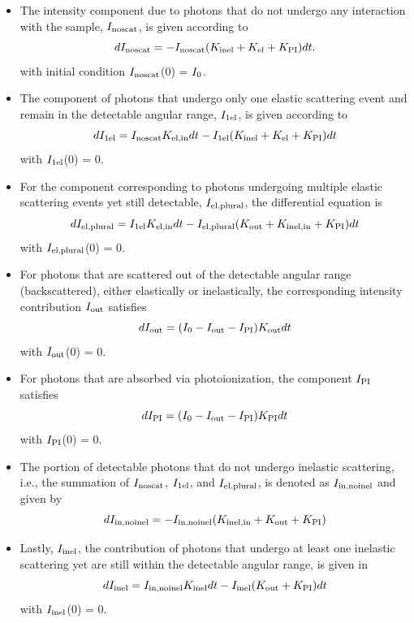 \documentclass[]{article}
\newcommand\nt{\textup{\scriptsize{0}}}
\newcommand\el{\textup{\scriptsize{el}}}
\newcommand\inel{\textup{\scriptsize{inel}}}
\newcommand\elin{\textup{\scriptsize{el,in}}}
\newcommand\inelin{\textup{\scriptsize{inel,in}}}
\newcommand\out{\textup{\scriptsize{out}}}
\newcommand\PI{\textup{\scriptsize{PI}}}
\newcommand\noscat{\textup{\scriptsize{noscat}}}
\newcommand\sel{\textup{\scriptsize{1el}}}
\newcommand\elpl{\textup{\scriptsize{el,plural}}}
\newcommand\innoinel{\textup{\scriptsize{in,noinel}}}
\begin{document}
\begin{itemize}

\item The intensity component due to photons that do not undergo any interaction with the sample, $I_{\noscat}$, is given according to
\begin{equation}
dI_{\noscat} = -I_{\noscat}(K_{\inel}+K_{\el}+K_{\PI}) dt.
\end{equation}
with initial condition $I_{\noscat}$(0) = $I_{\nt}$.

\item The component of photons that undergo only one elastic scattering event and remain in the detectable angular range, $I_{\sel}$, is given according to
\begin{equation}
dI_{\sel} = I_{\noscat}K_{\elin} dt - I_{\sel}(K_{\inel}+K_{\el}+K_{\PI}) dt
\end{equation}
with $I_{\sel}$(0) = 0.

\item For the component corresponding to photons undergoing multiple elastic scattering events yet still detectable, $I_{\elpl}$, the differential equation is
\begin{equation}
dI_{\elpl} = I_{\sel}K_{\elin} dt - I_{\elpl}(K_{\out}+K_{\inelin}+K_{\PI}) dt
\end{equation}
with $I_{\elpl}$(0) = 0.

\item For photons that are scattered out of the detectable angular range (backscattered), either elastically or inelastically, the corresponding intensity contribution $I_{\out}$ satisfies
\begin{equation}
dI_{\out} = (I_{\nt} - I_{\out} - I_{\PI})K_{\out} dt
\end{equation}
with $I_{\out}$(0) = 0.

\item For photons that are absorbed via photoionization, the component $I_{\PI}$ satisfies
\begin{equation}
dI_{\PI} = (I_{\nt} - I_{\out} - I_{\PI})K_{\PI} dt
\end{equation}
with $I_{\PI}$(0) = 0.

\item The portion of detectable photons that do not undergo inelastic scattering, i.e., the summation of $I_{\noscat}$, $I_{\sel}$, and $I_{\elpl}$, is denoted as $I_{\innoinel}$ and given by
\begin{equation}
dI_{\innoinel} = -I_{\innoinel}(K_{\inelin}+K_{\out}+K_{\PI})
\end{equation}

\item Lastly, $I_{\inel}$, the contribution of photons that undergo at least one inelastic scattering yet are still within the detectable angular range, is given in
\begin{equation}
dI_{\inel} = I_{\innoinel}K_{\inel} dt - I_{\inel}(K_{\out}+K_{\PI}) dt
\end{equation}
with $I_{\inel}$(0) = 0.

\end{itemize}
\end{document}
